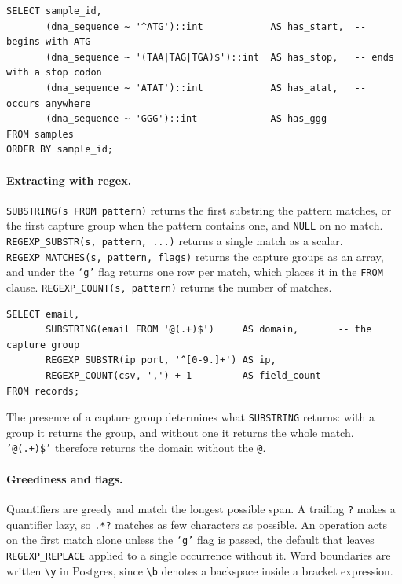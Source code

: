 \begin{lstlisting}[style=sql, caption={Presence flags from anchored and unanchored patterns}]
SELECT sample_id,
       (dna_sequence ~ '^ATG')::int            AS has_start,  -- begins with ATG
       (dna_sequence ~ '(TAA|TAG|TGA)$')::int  AS has_stop,   -- ends with a stop codon
       (dna_sequence ~ 'ATAT')::int            AS has_atat,   -- occurs anywhere
       (dna_sequence ~ 'GGG')::int             AS has_ggg
FROM samples
ORDER BY sample_id;
\end{lstlisting}

\vspace{-1ex}

\paragraph{Extracting with regex.} \texttt{SUBSTRING(s FROM pattern)} returns the first substring the pattern matches, or the first capture group when the pattern contains one, and \texttt{NULL} on no match. \texttt{REGEXP\_SUBSTR(s, pattern, ...)} returns a single match as a scalar. \texttt{REGEXP\_MATCHES(s, pattern, flags)} returns the capture groups as an array, and under the \texttt{`g'} flag returns one row per match, which places it in the \texttt{FROM} clause. \texttt{REGEXP\_COUNT(s, pattern)} returns the number of matches.

\begin{lstlisting}[style=sql, caption={Pulling fields out with a pattern}]
SELECT email,
       SUBSTRING(email FROM '@(.+)$')     AS domain,       -- the capture group
       REGEXP_SUBSTR(ip_port, '^[0-9.]+') AS ip,
       REGEXP_COUNT(csv, ',') + 1         AS field_count
FROM records;
\end{lstlisting}

\vspace{-1ex}

The presence of a capture group determines what \texttt{SUBSTRING} returns: with a group it returns the group, and without one it returns the whole match. \texttt{'@(.+)\$'} therefore returns the domain without the \texttt{@}.

\paragraph{Greediness and flags.} Quantifiers are greedy and match the longest possible span. A trailing \texttt{?} makes a quantifier lazy, so \texttt{.*?} matches as few characters as possible. An operation acts on the first match alone unless the \texttt{`g'} flag is passed, the default that leaves \texttt{REGEXP\_REPLACE} applied to a single occurrence without it. Word boundaries are written \texttt{\textbackslash y} in Postgres, since \texttt{\textbackslash b} denotes a backspace inside a bracket expression.

